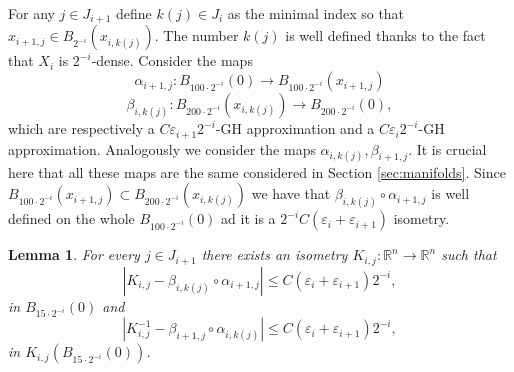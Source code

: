 \documentclass[11pt]{article}
\newcommand{\eps}{\varepsilon}
\newcommand{\rr}{\mathbb{R}}
\theoremstyle{plain}
\newtheorem{lemma}[theorem]{Lemma}
\theoremstyle{definition}
\numberwithin{equation}{section}
\begin{document}
For any $j \in J_{i+1}$ define $k(j)\in J_i$ as the minimal index so that $x_{i+1,j} \in B_{2^{-i}}(x_{i,k(j)})$. The number $k(j)$ is well defined thanks to the fact that $X_i$ is $2^{-i}$-dense. Consider the  maps
\[ \alpha_{i+1,j}: B_{100\cdot 2^{-i}}(0) \to B_{100\cdot 2^{-i}}(x_{i+1,j}) \]
\[ \beta_{i,k(j)}: B_{200\cdot 2^{-i}}(x_{i,k(j)}) \to B_{200\cdot 2^{-i}}(0), \]
which are respectively a $C \eps_{i+1}2^{-i}$-GH approximation and  a $C \eps_i 2^{-i}$-GH approximation. Analogously we consider the maps $\alpha_{i,k(j)},\beta_{i+1,j}$. It is crucial here that all these maps are the same considered in Section \ref{sec:manifolds}.
Since $B_{100\cdot 2^{-i}}(x_{i+1,j}) \subset B_{200\cdot 2^{-i}}(x_{i,k(j)}) $ we have that $\beta_{i,k(j)}\circ \alpha_{i+1,j}$ is well defined on the whole $B_{100\cdot 2^{-i}}(0)$ ad it is a $2^{-i}C(\eps_i+\eps_{i+1})$ isometry. 
\begin{lemma}\label{kjlemma}
	For every $j \in J_{i+1}$ there exists an isometry $K_{i,j}:\rr^n \to \rr^n$ such that 
	\begin{equation}\label{kj}
		|K_{i,j}-\beta_{i,k(j)}\circ \alpha_{i+1,j}|\le C(\eps_i+\eps_{i+1}) 2^{-i},
	\end{equation}
	in $B_{15\cdot 2^{-i}}(0)$ and
	\begin{equation}\label{kjinv} |K_{i,j}^{-1}-\beta_{i+1,j}\circ \alpha_{i,k(j)}|\le C(\eps_i+\eps_{i+1})2^{-i},
	\end{equation}
	in $K_{i,j}(B_{15\cdot 2^{-i}}(0))$.
\end{lemma}
\end{document}
